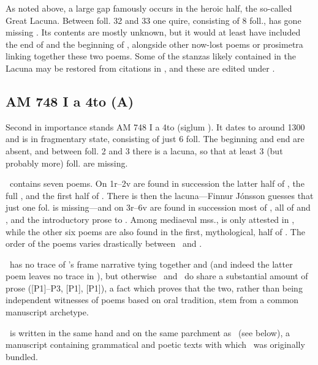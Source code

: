 As noted above, a large gap famously occurs in the heroic half, the so-called Great Lacuna.  Between foll. 32 and 33 one quire, consisting of 8 foll., has gone missing \parencite[6 n. 2]{Lindblad1977}.  Its contents are mostly unknown, but it would at least have included the end of  and the beginning of , alongside other now-lost poems or prosimetra linking together these two poems.  Some of the stanzas likely contained in the Lacuna may be restored from citations in \VolsungaSaga, and these are edited under .

\subsection{AM 748 I a 4to (A)}

Second in importance stands AM 748 I a 4to (siglum \AM).  It dates to around 1300 and is in fragmentary state, consisting of just 6 foll.  The beginning and end are absent, and between foll. 2 and 3 there is a lacuna, so that at least 3 (but probably more) foll. are missing.

\AM\ contains seven poems.  On 1r--2v are found in succession the latter half of , the full , and the first half of .  There is then the lacuna---Finnur Jónsson guesses that just one fol. is missing---and on 3r--6v are found in succession most of , all of  and , and the introductory prose to .  Among mediaeval mss.,  is only attested in \AM, while the other six poems are also found in the first, mythological, half of \Regius. The order of the poems varies drastically between \AM\ and \Regius.

\AM\ has no trace of \Regius’s frame narrative tying together  and  (and indeed the latter poem leaves no trace in \AM), but otherwise \AM\ and \Regius\ do share a substantial amount of prose ([P1]--P3, [P1], [P1]), a fact which proves that the two, rather than being independent witnesses of poems based on oral tradition, stem from a common manuscript archetype.

\AM\ is written in the same hand and on the same parchment as \AMb\ (see below), a manuscript containing grammatical and poetic texts with which \AM\ was originally bundled.

